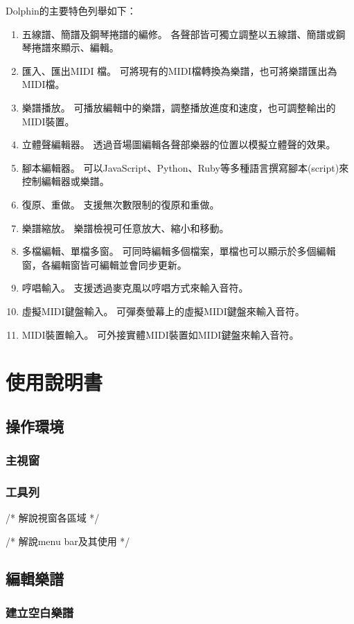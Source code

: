 \documentclass[12pt,a4paper,oneside]{report}
\begin{document}
Dolphin的主要特色列舉如下：
\begin{enumerate}
\item 五線譜、簡譜及鋼琴捲譜的編修。
      各聲部皆可獨立調整以五線譜、簡譜或鋼琴捲譜來顯示、編輯。
\item 匯入、匯出MIDI 檔。
      可將現有的MIDI檔轉換為樂譜，也可將樂譜匯出為MIDI檔。
\item 樂譜播放。
      可播放編輯中的樂譜，調整播放進度和速度，也可調整輸出的MIDI裝置。
\item 立體聲編輯器。
      透過音場圖編輯各聲部樂器的位置以模擬立體聲的效果。
\item 腳本編輯器。
      可以JavaScript、Python、Ruby等多種語言撰寫腳本(script)來控制編輯器或樂譜。
\item 復原、重做。
      支援無次數限制的復原和重做。
\item 樂譜縮放。
      樂譜檢視可任意放大、縮小和移動。
\item 多檔編輯、單檔多窗。
      可同時編輯多個檔案，單檔也可以顯示於多個編輯窗，各編輯窗皆可編輯並會同步更新。
\item 哼唱輸入。
      支援透過麥克風以哼唱方式來輸入音符。
\item 虛擬MIDI鍵盤輸入。
      可彈奏螢幕上的虛擬MIDI鍵盤來輸入音符。
\item MIDI裝置輸入。
      可外接實體MIDI裝置如MIDI鍵盤來輸入音符。 
\end{enumerate}

\chapter{使用說明書}
\section{操作環境}
\subsection{主視窗}
\subsection{工具列}
/* 
解說視窗各區域
*/

/* 
解說menu bar及其使用
*/
\section{編輯樂譜}
   \subsection{建立空白樂譜}
\end{document}
